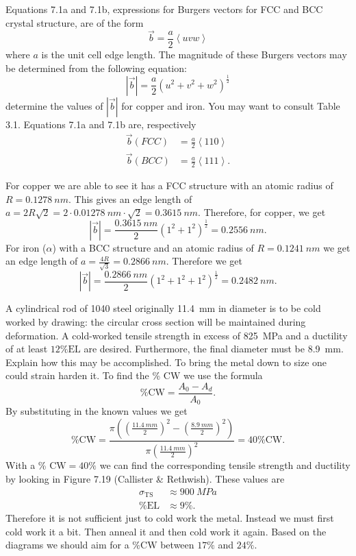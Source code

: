 
 Equations 7.1a and 7.1b, expressions for Burgers vectors for FCC and BCC crystal structure, are of the form
\[ 
\Vec{b} = \frac{a}{2} \left\langle uvw \right\rangle
\]
where $a$ is the unit cell edge length. The magnitude of these Burgers vectors may be determined from the following equation:
\[ 
\left| \Vec{b} \right| = \frac{a}{2} \left( u^2 + v^2 + w^2 \right)^{\frac{1}{2}}
\]
determine the values of $\left| \Vec{b} \right|$ for copper and iron. You may want to consult Table 3.1.
\bigbreak
Equations 7.1a and 7.1b are, respectively
\begin{align*}
  \Vec{b}(FCC) &= \frac{a}{2} \left\langle 110 \right\rangle \\
  \Vec{b}(BCC) &= \frac{a}{2} \left\langle 111 \right\rangle
.\end{align*}

For copper we are able to see it has a FCC structure with an atomic radius of $R = \qty{0,1278}{nm}$. This gives an edge length of $a = 2R \sqrt{2} = 2\cdot \qty{0,01278}{nm}\cdot \sqrt{2} = \qty{0,3615}{nm}$. Therefore, for copper, we get
\[ 
\left| \Vec{b} \right| = \frac{\qty{0,3615}{nm}}{2} \left( 1^2 + 1^2 \right)^{\frac{1}{2}} = \qty{0,2556}{nm} 
.\]
For iron ($\alpha$) with a BCC structure and an atomic radius of $R = \qty{0,1241}{nm}$ we get an edge length of $a = \frac{4R}{\sqrt{3}} = \qty{0,2866}{nm}$. Therefore we get
\[ 
\left| \Vec{b} \right| = \frac{\qty{0,2866}{nm}}{2} \left( 1^2 + 1^2 + 1^2 \right)^{\frac{1}{2}} = \qty{0,2482}{nm} 
.\]


 A cylindrical rod of 1040 steel originally \qty{11,4}{mm} in diameter is to be cold worked by drawing: the circular cross section will be maintained during deformation. A cold-worked tensile strength in excess of \qty{825}{MPa} and a ductility of at least $12 \% \mathrm{EL}$ are desired. Furthermore, the final diameter must be \qty{8,9}{mm}. Explain how this may be accomplished. 
\bigbreak
To bring the metal down to size one could strain harden it. To find the \% $\mathrm{CW}$ we use the formula
\[ 
\% \mathrm{CW} = \frac{A_0 - A_d}{A_0}
.\]
By substituting in the known values we get
\[ 
  \% \mathrm{CW} = \frac{\pi \left( \left( \frac{\qty{11,4}{mm} }{2} \right)^2 - \left( \frac{\qty{8,9}{mm} }{2} \right)^2 \right) }{\pi \left( \frac{\qty{11,4}{mm} }{2} \right)^2} = 40 \% \mathrm{CW}  
.\]
With a \% $\mathrm{CW} = \num{40} \%$ we can find the corresponding tensile strength and ductility by looking in Figure 7.19 (Callister \& Rethwish). These values are
\begin{align*}
  \sigma_{\mathrm{TS}} &\approx \qty{900}{MPa}  \\
  \% \mathrm{EL} &\approx 9 \% 
.\end{align*}
Therefore it is not sufficient just to cold work the metal. Instead we must first cold work it a bit. Then anneal it and then cold work it again. Based on the diagrams we should aim for a $\% \mathrm{CW}$ between $17\%$ and $24\%$.
